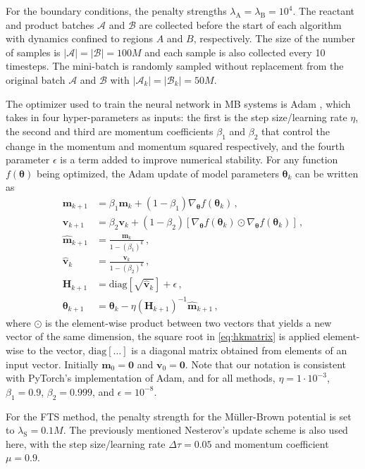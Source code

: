 \documentclass{article}
\numberwithin{equation}{section}
\def\*#1{\mathbf{#1}}
\theoremstyle{definition}
\theoremstyle{remark}
\def\thetab{\boldsymbol{\theta}}
\begin{document}
For the boundary conditions, the penalty strengths $\lambda_\mathrm{A}=\lambda_\mathrm{B}=10^4$. 
The reactant and product batches $\mathcal{A}$ and $\mathcal{B}$ are collected before the start of each algorithm with dynamics confined to regions $A$ and $B$, respectively. The size of the number of samples is $|\mathcal{A}|=|\mathcal{B}|=100M$ and each sample is also collected every 10 timesteps. The mini-batch is randomly sampled without replacement from the original batch $\mathcal{A}$ and $\mathcal{B}$ with $|\mathcal{A}_k|=|\mathcal{B}_k|=50M$. 

The optimizer used to train the neural network in MB systems is Adam \cite{kingma2014adam}, which takes in four hyper-parameters as inputs: the first is the step size/learning rate $\eta$, the second and third are momentum coefficients $\beta_1 $ and $ \beta_2$ that control the change in the momentum and momentum squared respectively, and the fourth parameter $ \epsilon $ is a term added to improve numerical stability. For any function $f(\thetab)$  being optimized, the Adam update of model parameters $\thetab_{k}$ can be written as
\begin{align}
    \* m_{k+1} &= \beta_1 \*  m_k+(1-\beta_1) \nabla_{\thetab} f(\thetab_k) \,,
\\ \label{eq:adam_begin}
    \* v_{k+1} &= \beta_2  \* v_k+(1-\beta_2) \left[ \nabla_{\thetab} f(\thetab_k) \odot \nabla_{\thetab} f(\thetab_k) \right] \,,
\\
    \hat{\*  m}_{k+1} &= \frac{\*  m_k}{1-(\beta_1)^k} \,,
\\
    \hat{\* v}_k &= \frac{\* v_k}{1-(\beta_2)^k}  \,,
\\
    \* H_{k+1} &= \mathrm{diag}\left[\sqrt{\hat{\* v}_k } \right]+\epsilon \*  \,, \label{eq:hkmatrix}
\\
    \thetab_{k+1} &= \thetab_{k}-\eta (\* H_{k+1})^{-1}\hat{\* m}_{k+1}  \,, \label{eq:adam_end}
\end{align}
where $\odot$ is the element-wise product between two vectors that yields a new vector of the same dimension, the square root in \cref{eq:hkmatrix} is applied element-wise to the vector, $\mathrm{diag}\left[\ldots \right]$ is a diagonal matrix obtained from elements of an input vector. Initially $\* m_0 = \* 0$ and $\* v_0 = \* 0$. Note that our notation is consistent with PyTorch's implementation of Adam, and for all methods, $\eta = 1 \cdot 10^{-3}$, $\beta_1 = 0.9 $, $\beta_2 = 0.999 $, and $ \epsilon = 10^{-8} $. 

For the FTS method, the penalty strength for the M{\"u}ller-Brown potential is set to $\lambda_\mathrm{S} = 0.1M$. The previously mentioned Nesterov's update scheme is also used here, with the step size/learning rate $\Delta \tau= 0.05$ and momentum coefficient $\mu = 0.9$. 
\end{document}
